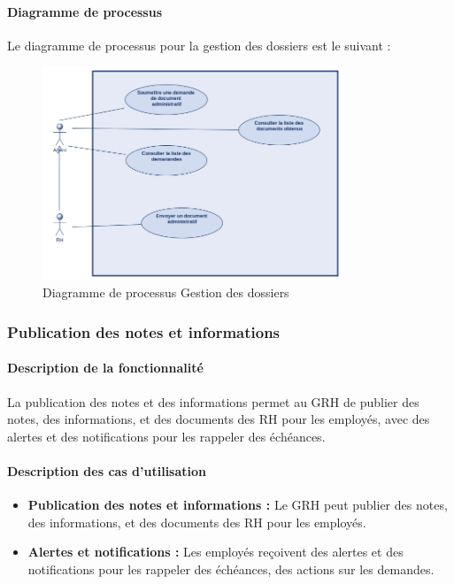 \paragraph{Diagramme de processus}
Le diagramme de processus pour la gestion des dossiers est le suivant :
\begin{figure}[H]
    \centering
    \includegraphics[width=0.8\textwidth]{images/diagrammes/flowcharts/dossiers.png}
    \caption{Diagramme de processus Gestion des dossiers}
    \label{fig:flow_gestion_dossiers}
\end{figure}
\subsubsection{Publication des notes et informations}
\paragraph{Description de la fonctionnalité}
La publication des notes et des informations permet au GRH de publier des notes, des informations, et des documents des \ac{RH} pour les employés, avec des alertes et des notifications pour les rappeler des échéances.
\paragraph{Description des cas d'utilisation}   
\begin{itemize}
    \item \textbf{Publication des notes et informations :} Le GRH peut publier des notes, des informations, et des documents des \ac{RH} pour les employés.
    \item \textbf{Alertes et notifications :} Les employés reçoivent des alertes et des notifications pour les rappeler des échéances, des actions sur les demandes.
\end{itemize}
